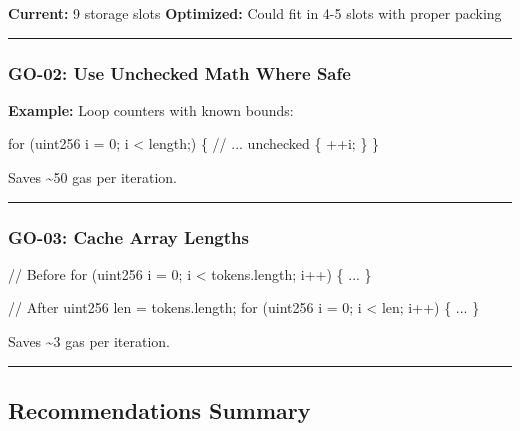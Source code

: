 \documentclass[
]{article}
\newenvironment{Shaded}{}{}
\newcommand{\NormalTok}[1]{#1}
\begin{document}
\textbf{Current:} 9 storage slots \textbf{Optimized:} Could fit in 4-5
slots with proper packing

\begin{center}\rule{0.5\linewidth}{0.5pt}\end{center}

\subsubsection{GO-02: Use Unchecked Math Where
Safe}\label{go-02-use-unchecked-math-where-safe}

\textbf{Example:} Loop counters with known bounds:

\begin{Shaded}
\begin{Highlighting}[]
\NormalTok{for (uint256 i = 0; i \textless{} length;) \{}
\NormalTok{    // ...}
\NormalTok{    unchecked \{ ++i; \}}
\NormalTok{\}}
\end{Highlighting}
\end{Shaded}

Saves \textasciitilde50 gas per iteration.

\begin{center}\rule{0.5\linewidth}{0.5pt}\end{center}

\subsubsection{GO-03: Cache Array
Lengths}\label{go-03-cache-array-lengths}

\begin{Shaded}
\begin{Highlighting}[]
\NormalTok{// Before}
\NormalTok{for (uint256 i = 0; i \textless{} tokens.length; i++) \{ ... \}}

\NormalTok{// After}
\NormalTok{uint256 len = tokens.length;}
\NormalTok{for (uint256 i = 0; i \textless{} len; i++) \{ ... \}}
\end{Highlighting}
\end{Shaded}

Saves \textasciitilde3 gas per iteration.

\begin{center}\rule{0.5\linewidth}{0.5pt}\end{center}

\subsection{Recommendations Summary}\label{recommendations-summary}
\end{document}
